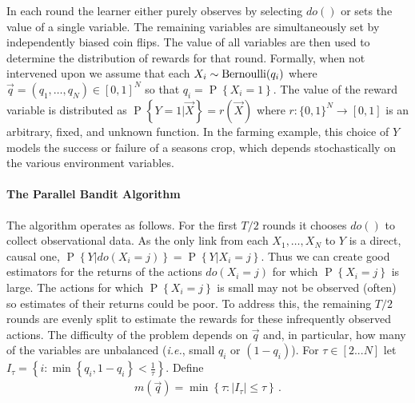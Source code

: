 \documentclass{article}
\newcommand{\E}[1]{\mathbb E\left[#1\right]}
\newcommand{\set}[1]{\left\{#1\right\}}
\newcommand{\ind}[1]{\mathds{1}\!\!\set{#1}}
\newcommand{\argmax}{\operatornamewithlimits{arg\,max}}
\newcommand{\eq}[1]{\begin{align*}#1\end{align*}}
\renewcommand{\P}[1]{\operatorname{P}\left\{#1\right\}}
\newcommand{\actions}{\mathcal{A}}
\newcommand{\ie}{\textit{i.e.}}
\theoremstyle{plain}
\theoremstyle{definition}
\begin{document}
In each round the learner either purely observes by selecting $do()$ or sets the value of a single variable. The remaining variables are simultaneously set by independently biased coin flips. 
The value of all variables are then used to determine the distribution of rewards for that round.
Formally, when not intervened upon we assume that each $X_i \sim \operatorname{Bernoulli}(q_i)$ where $\vec{q} = (q_1, \ldots, q_N) \in [0,1]^N$ so that $q_i = \P{X_i = 1}$.
The value of the reward variable is distributed as $\P{Y = 1|\vec{X}} = r(\vec{X})$ where 
$r : \{0,1\}^N \to [0,1]$ is an arbitrary, fixed, and unknown function. 
In the farming example, this choice of $Y$ models the success or failure of a seasons crop, which depends stochastically on the various environment variables.


\paragraph{The Parallel Bandit Algorithm}

The algorithm operates as follows. For the first $T/2$ rounds it chooses $do()$ to collect observational data. As the only link from each $X_1,\ldots,X_N$ to $Y$ is a direct, causal one, $\P{Y|do(X_i=j)}=\P{Y|X_i=j}$. Thus we can create good estimators for the returns of the actions $do(X_i = j)$ for which $\P{X_i = j}$ is large. The actions for which $\P{X_i = j}$ is small may not be observed (often) so  estimates of their returns could be poor. To address this, the remaining $T/2$ rounds are evenly split to estimate the rewards for these infrequently observed actions. The difficulty of the problem depends on $\vec{q}$ and, in particular, how many of the variables are unbalanced (\ie, small $q_i$ or $(1-q_i)$). For $\tau \in [2...N]$ let $I_\tau = \set{ i : \min\set{q_i, 1-q_i} < \frac{1}{\tau}}$. Define
\eq{
\label{eq:m-simple}
m(\vec{q}) = \min \set{ \tau : |I_{\tau}| \leq \tau}\,.
}
\end{document}

